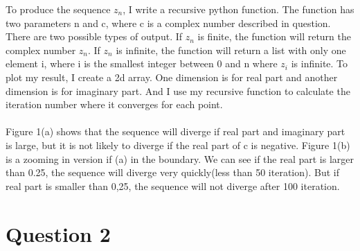 \documentclass{article}
\begin{document}
\indent To produce the sequence $z_n$, I write a recursive python function. The function has two parameters n and c, where c is a complex number described in question. There are two possible types of output. If $z_n$ is finite, the function will return the complex number $z_n$. If $z_n$ is infinite, the function will return a list with only one element i, where i is the smallest integer between 0 and n where $z_i$ is infinite. To plot my result, I create a 2d array. One dimension is for real part and another dimension is for imaginary part. And I use my recursive function to calculate the iteration number where it converges for each point.\\
\\
\indent Figure 1(a) shows that the sequence will diverge if real part and imaginary part is large, but it is not likely to diverge if the real part of c is negative. Figure 1(b) is a zooming in version if (a) in the boundary. We can see if the real part is larger than 0.25, the sequence will diverge very quickly(less than 50 iteration). But if real part is smaller than 0,25, the sequence will not diverge after 100 iteration. 


\section*{Question 2}
\end{document}
